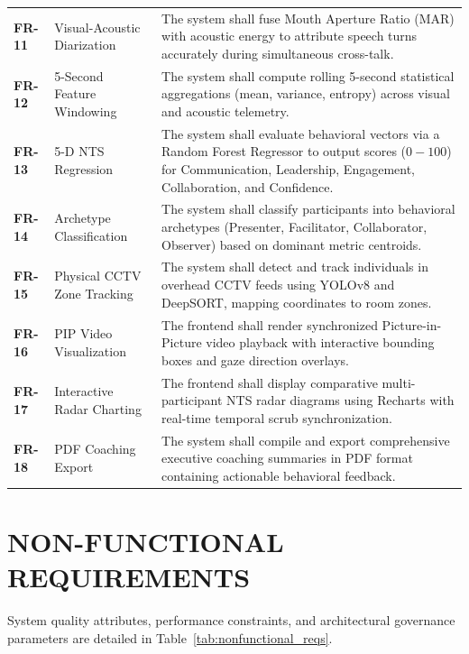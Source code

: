 \documentclass[12pt,a4paper,oneside]{report}
\begin{document}
\begin{table}[htbp]
\begin{tabularx}{\textwidth}{@{}l p{3.2cm} X@{}}
\textbf{FR-11} & Visual-Acoustic Diarization & The system shall fuse Mouth Aperture Ratio (MAR) with acoustic energy to attribute speech turns accurately during simultaneous cross-talk. \\
\textbf{FR-12} & 5-Second Feature Windowing & The system shall compute rolling 5-second statistical aggregations (mean, variance, entropy) across visual and acoustic telemetry. \\
\textbf{FR-13} & 5-D NTS Regression & The system shall evaluate behavioral vectors via a Random Forest Regressor to output scores ($0-100$) for Communication, Leadership, Engagement, Collaboration, and Confidence. \\
\textbf{FR-14} & Archetype Classification & The system shall classify participants into behavioral archetypes (Presenter, Facilitator, Collaborator, Observer) based on dominant metric centroids. \\
\textbf{FR-15} & Physical CCTV Zone Tracking & The system shall detect and track individuals in overhead CCTV feeds using YOLOv8 and DeepSORT, mapping coordinates to room zones. \\
\textbf{FR-16} & PIP Video Visualization & The frontend shall render synchronized Picture-in-Picture video playback with interactive bounding boxes and gaze direction overlays. \\
\textbf{FR-17} & Interactive Radar Charting & The frontend shall display comparative multi-participant NTS radar diagrams using Recharts with real-time temporal scrub synchronization. \\
\textbf{FR-18} & PDF Coaching Export & The system shall compile and export comprehensive executive coaching summaries in PDF format containing actionable behavioral feedback. \\
\bottomrule
\end{tabularx}
\end{table}

\section{NON-FUNCTIONAL REQUIREMENTS}
System quality attributes, performance constraints, and architectural governance parameters are detailed in Table~\ref{tab:nonfunctional_reqs}.
\end{document}
